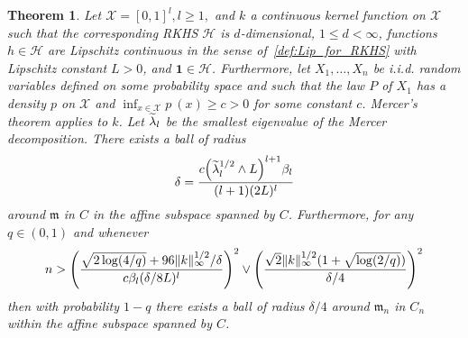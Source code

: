 \documentclass[10pt]{amsart}
\newtheorem{theo}{Theorem}[section]
\theoremstyle{definition}\newtheorem{defi}[theo]{Definition}\newtheorem{rema}[theo]{Remark}\newtheorem{exam}[theo]{Example}\newtheorem{exem}[theo]{Example}\newtheorem{nota}[theo]{Notation}
\theoremstyle{remark}
\newcommand{\X}{\mathcal{X}}
\newcommand{\cH}{\mathcal{H}}
\newcommand{\mean}{\mathfrak{m}}
\let\oldtilde\tilde
\renewcommand*{\tilde}[1]{\mathchoice{\widetilde{#1}}{\widetilde{#1}}{\oldtilde{#1}}{\oldtilde{#1}}}
\let\originalleft\left
\let\originalright\right
\renewcommand{\left}{\mathopen{}\mathclose\bgroup\originalleft}
\renewcommand{\right}{\aftergroup\egroup\originalright}
\begin{document}
\begin{theo}\label{thm:ball_in_empirical}
Let $\X = [0,1]^l, l \geq 1,$ and $k$ a continuous kernel function on $\X$ such that the corresponding RKHS $\cH$ is $d$-dimensional, $1 \leq d < \infty$, functions $h \in \cH$ are Lipschitz continuous in the sense of~\eqref{def:Lip_for_RKHS} with Lipschitz constant $L>0$, and $\bm 1 \in \cH$. Furthermore, let $X_1,\dots, X_n$ be i.i.d. random variables defined on some probability space and such that the law $P$ of $X_1$ has a density $p$ on $\X$ and $\inf_{x\in\X} p~(x) \geq c >0$ for some constant $c$. Mercer's theorem applies to $k$. Let $\tilde \lambda_l$ be the smallest eigenvalue of the Mercer decomposition. There exists a ball of radius
\[
\delta = \frac{c\left(\tilde \lambda_l^{1/2} \wedge L\right)^{l+1}\beta_l}{(l+1) (2L)^l}
\]
around $\mean$ in $C$ in the affine subspace spanned by $C$. Furthermore, for any $q \in (0,1)$ and whenever
\[
n > \left(\frac{\sqrt{2\log(4/q)} + 96 \|k\|_\infty^{1/2}/\delta}{c\beta_l(\delta/8L)^l}\right)^{2} \vee
\left(\frac{\sqrt{2} \|k\|^{1/2}_\infty (1 + \sqrt{\log(2/q)})}{\delta/4}\right)^{2}
\]
then with probability $1-q$ there exists a ball of radius $\delta/4$ around $\mean_n$ in $C_n$ within the affine subspace spanned by $C$.
\end{theo}
\end{document}

